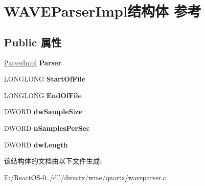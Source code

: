 \hypertarget{struct_w_a_v_e_parser_impl}{}\section{W\+A\+V\+E\+Parser\+Impl结构体 参考}
\label{struct_w_a_v_e_parser_impl}
\subsection*{Public 属性}
\begin{DoxyCompactItemize}
\item 
\mbox{\label{struct_w_a_v_e_parser_impl_ab970b11f0b9f3d048f1f2c885cc765ee}} 
\hyperlink{struct_parser_impl}{Parser\+Impl} {\bfseries Parser}
\item 
\mbox{\label{struct_w_a_v_e_parser_impl_a63ba6f8d47be71e7aa72ec312a4229bc}} 
L\+O\+N\+G\+L\+O\+NG {\bfseries Start\+Of\+File}
\item 
\mbox{\label{struct_w_a_v_e_parser_impl_a482df15d0d37727daaebca1f985ceb3b}} 
L\+O\+N\+G\+L\+O\+NG {\bfseries End\+Of\+File}
\item 
\mbox{\label{struct_w_a_v_e_parser_impl_ada086b0d8bafb18ab7c49bce78e2a8a9}} 
D\+W\+O\+RD {\bfseries dw\+Sample\+Size}
\item 
\mbox{\label{struct_w_a_v_e_parser_impl_ae004477f5ca7507241e4c0db1e3beb0d}} 
D\+W\+O\+RD {\bfseries n\+Samples\+Per\+Sec}
\item 
\mbox{\label{struct_w_a_v_e_parser_impl_a4be9030fa1a3d97f4dc1da3ca1355749}} 
D\+W\+O\+RD {\bfseries dw\+Length}
\end{DoxyCompactItemize}


该结构体的文档由以下文件生成\+:\begin{DoxyCompactItemize}
\item 
E\+:/\+React\+O\+S-\/0../dll/directx/wine/quartz/waveparser.\+c\end{DoxyCompactItemize}
